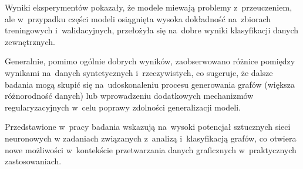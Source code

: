 Wyniki eksperymentów pokazały, że modele miewają problemy z~przeuczeniem,
ale w~przypadku części modeli osiągnięta wysoka dokładność na~zbiorach treningowych i~walidacyjnych,
przełożyła się na~dobre wyniki klasyfikacji danych zewnętrznych.

Generalnie, pomimo ogólnie dobrych wyników,
zaobserwowano różnice pomiędzy wynikami na~danych syntetycznych i~rzeczywistych,
co sugeruje, że dalsze badania mogą skupić się na~udoskonaleniu procesu generowania grafów (większa różnorodność danych)
lub wprowadzeniu dodatkowych mechanizmów regularyzacyjnych w~celu poprawy zdolności generalizacji modeli.

Przedstawione w~pracy badania wskazują na~wysoki potencjał sztucznych sieci neuronowych
w zadaniach związanych z~analizą i~klasyfikacją grafów,
co otwiera nowe możliwości w~kontekście przetwarzania danych graficznych w~praktycznych zastosowaniach.